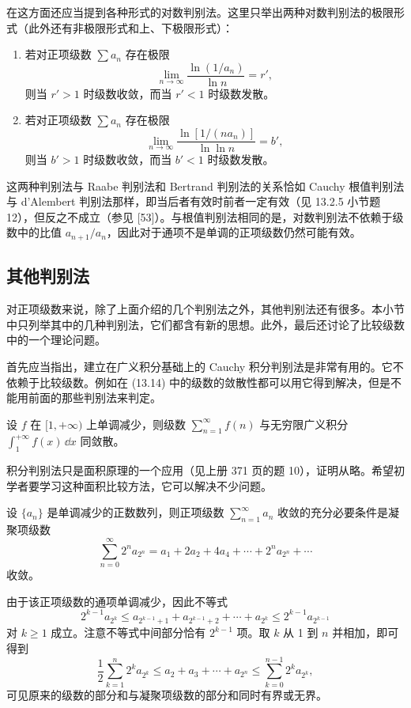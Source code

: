 \begin{xremark}
在这方面还应当提到各种形式的对数判别法。这里只举出两种对数判别法的极限形式（此外还有非极限形式和上、下极限形式）：
\begin{enumerate}[label=\arabic*.]
\item 若对正项级数 $\sum a_n$ 存在极限
\begin{equation}
\lim_{n\to\infty}\frac{\ln(1/a_n)}{\ln n}=r',
\tag{13.15}
\end{equation}
则当 $r'>1$ 时级数收敛，而当 $r'<1$ 时级数发散。
\item 若对正项级数 $\sum a_n$ 存在极限
\begin{equation}
\lim_{n\to\infty}\frac{\ln[1/(na_n)]}{\ln\ln n}=b',
\tag{13.16}
\end{equation}
则当 $b'>1$ 时级数收敛，而当 $b'<1$ 时级数发散。
\end{enumerate}
这两种判别法与 Raabe 判别法和 Bertrand 判别法的关系恰如 Cauchy 根值判别法与 d'Alembert 判别法那样，即当后者有效时前者一定有效（见 13.2.5 小节题 12），但反之不成立（参见 [53]）。与根值判别法相同的是，对数判别法不依赖于级数中的比值 $a_{n+1}/a_n$，因此对于通项不是单调的正项级数仍然可能有效。
\end{xremark}

\subsection{其他判别法}

对正项级数来说，除了上面介绍的几个判别法之外，其他判别法还有很多。本小节中只列举其中的几种判别法，它们都含有新的思想。此外，最后还讨论了比较级数中的一个理论问题。

首先应当指出，建立在广义积分基础上的 Cauchy 积分判别法是非常有用的。它不依赖于比较级数。例如在 (13.14) 中的级数的敛散性都可以用它得到解决，但是不能用前面的那些判别法来判定。

\begin{xproposition}
设 $f$ 在 $[1,+\infty)$ 上单调减少，则级数 $\sum_{n=1}^{\infty}f(n)$ 与无穷限广义积分 $\int_1^{+\infty}f(x)\,\dd x$ 同敛散。
\end{xproposition}

\begin{xremark}
积分判别法只是面积原理的一个应用（见上册 371 页的题 10），证明从略。希望初学者要学习这种面积比较方法，它可以解决不少问题。
\end{xremark}

\begin{xproposition}
设 $\{a_n\}$ 是单调减少的正数数列，则正项级数 $\sum_{n=1}^{\infty}a_n$ 收敛的充分必要条件是凝聚项级数
\[
\sum_{n=0}^{\infty}2^na_{2^n}=a_1+2a_2+4a_4+\cdots+2^na_{2^n}+\cdots
\]
收敛。
\end{xproposition}
\begin{xproof}
由于该正项级数的通项单调减少，因此不等式
\[
2^{k-1}a_{2^k}\leq a_{2^{k-1}+1}+a_{2^{k-1}+2}+\cdots+a_{2^k}\leq2^{k-1}a_{2^{k-1}}
\]
对 $k\geq1$ 成立。注意不等式中间部分恰有 $2^{k-1}$ 项。取 $k$ 从 1 到 $n$ 并相加，即可得到
\[
\frac12\sum_{k=1}^{n}2^ka_{2^k}\leq a_2+a_3+\cdots+a_{2^n}\leq\sum_{k=0}^{n-1}2^ka_{2^k},
\]
可见原来的级数的部分和与凝聚项级数的部分和同时有界或无界。
\end{xproof}

